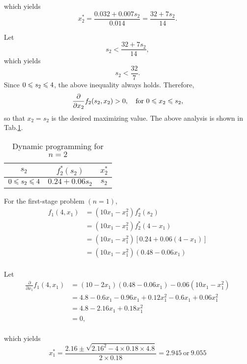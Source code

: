 \documentclass[a4paper]{article}
\begin{document}
\begin{enumerate}
\begin{solution}
	which yields
	\begin{equation*}
		x_2^*=\frac{0.032+0.007s_2}{0.014}=\frac{32+7s_2}{14}.
	\end{equation*}
	
	Let $$s_2<\frac{32+7s_2}{14},$$ which yields $$s_2<\frac{32}{7}.$$
	Since $0\leqslant s_2\leqslant4$, the above inequality always holds. Therefore,
	\begin{equation*}
		\frac{\partial}{\partial x_2}f_2(s_2,x_2)>0,\quad \text{for} \ 0\leqslant x_2\leqslant s_2,
	\end{equation*}
	so that $x_2=s_2$ is the desired maximizing value. The above analysis is shown in Tab.\ref{tab2n2}.
	\begin{table}[h]
	  	\centering
	  	\caption{Dynamic programming for $n=2$}
	  	\label{tab2n2}
	  	\begin{tabular}{ccc}
	  		\toprule[1.5pt]
	  		$s_2$&$f_2^*(s_2)$&$x_2^*$\\
	  		\midrule
	  		$0\leqslant s_2\leqslant4$&$0.24+0.06s_2$&$s_2$\\
	  		\bottomrule[1.5pt]
	  	\end{tabular}
  	\end{table}
	
	For the first-stage problem $(n=1)$,
	\begin{equation*}
	\begin{aligned}
		f_1(4,x_1)&=(10x_1-x_1^2)f_2^*(s_2)\\
		&=(10x_1-x_1^2)f_2^*(4-x_1)\\
		&=(10x_1-x_1^2)[0.24+0.06(4-x_1)]\\
		&=(10x_1-x_1^2)(0.48-0.06x_1)\\
	\end{aligned}	
	\end{equation*}
	
	Let
	\begin{equation*}
	\begin{aligned}
		\frac{\partial}{\partial x_1}f_1(4,x_1)
		&=(10-2x_1)(0.48-0.06x_1)-0.06(10x_1-x_1^2)\\
		&=4.8-0.6x_1-0.96x_1+0.12x_1^2-0.6x_1+0.06x_1^2\\
		&=4.8-2.16x_1+0.18x_1^2\\
		&=0,\\
		\end{aligned}
	\end{equation*}
	
	which yields
	\begin{equation*}
		x_1^*=\frac{2.16\pm\sqrt{2.16^2-4\times0.18\times4.8}}{2\times0.18}=2.945\ \text{or}\ 9.055
	\end{equation*}
	

\end{solution}
\end{enumerate}
\end{document}
